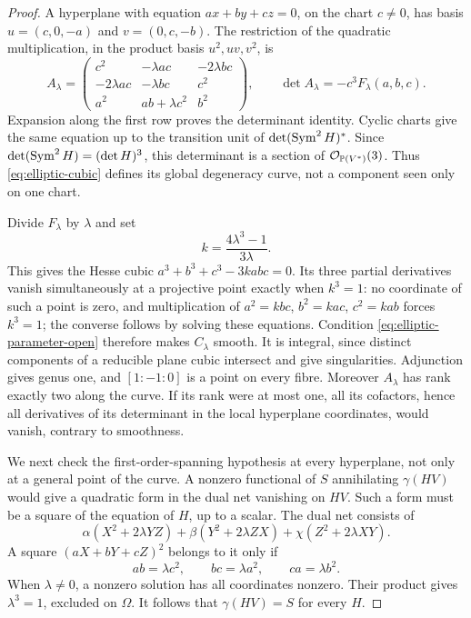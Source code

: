 \begin{proof}
A hyperplane with equation $ax+by+cz=0$, on the chart $c\ne0$,
has basis $u=(c,0,-a)$ and $v=(0,c,-b)$. The restriction of the
quadratic multiplication, in the product basis $u^2,uv,v^2$, is
\begin{equation}\label{eq:elliptic-restriction-matrix}
 A_\lambda=
 \begin{pmatrix}
 c^2&-\lambda ac&-2\lambda bc\\
 -2\lambda ac&-\lambda bc&c^2\\
 a^2&ab+\lambda c^2&b^2
 \end{pmatrix},
 \qquad \det A_\lambda=-c^3F_\lambda(a,b,c).
\end{equation}
Expansion along the first row proves the determinant identity.
Cyclic charts give the same equation up to the transition unit of
$\det(\operatorname{Sym}^2H)^*$. Since $\det(\operatorname{Sym}^2H)=(\det H)^3$,
this determinant is a section of $\mathcal O_{\mathbb P(V^*)}(3)$.
Thus \eqref{eq:elliptic-cubic} defines its global degeneracy curve,
not a component seen only on one chart.

Divide $F_\lambda$ by $\lambda$ and set
\[
 k=\frac{4\lambda^3-1}{3\lambda}.
\]
This gives the Hesse cubic $a^3+b^3+c^3-3kabc=0$.
Its three partial derivatives vanish simultaneously at a projective
point exactly when $k^3=1$: no coordinate of such a point is zero,
and multiplication of $a^2=kbc$, $b^2=kac$, $c^2=kab$ forces
$k^3=1$; the converse follows by solving these equations.
Condition \eqref{eq:elliptic-parameter-open} therefore makes
$C_\lambda$ smooth. It is integral, since distinct components of
a reducible plane cubic intersect and give singularities. Adjunction
gives genus one, and $[1:-1:0]$ is a point on every fibre.
Moreover $A_\lambda$ has rank exactly two along the curve. If
its rank were at most one, all its cofactors, hence all derivatives
of its determinant in the local hyperplane coordinates, would vanish,
contrary to smoothness.

We next check the first-order-spanning hypothesis at every hyperplane,
not only at a general point of the curve. A nonzero functional of $S$
annihilating $\gamma(HV)$ would give a quadratic form in the dual
net vanishing on $HV$. Such a form must be a square of the equation
of $H$, up to a scalar. The dual net consists of
\[
 \alpha(X^2+2\lambda YZ)+\beta(Y^2+2\lambda ZX)
                      +\chi(Z^2+2\lambda XY).
\]
A square $(aX+bY+cZ)^2$ belongs to it only if
\[
 ab=\lambda c^2,\qquad bc=\lambda a^2,\qquad ca=\lambda b^2.
\]
When $\lambda\ne0$, a nonzero solution has all coordinates nonzero.
Their product gives $\lambda^3=1$, excluded on $\Omega$.
It follows that $\gamma(HV)=S$ for every $H$.


\end{proof}
